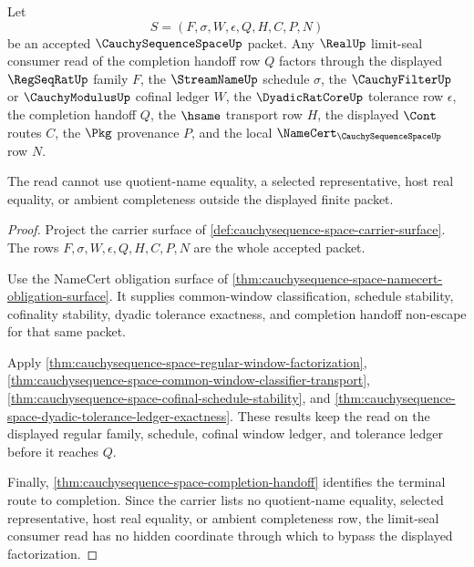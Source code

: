 \begin{theorem}
\label{thm:cauchysequence-space-limit-seal-factorization}
Let
$$
S=(F,\sigma,W,\epsilon,Q,H,C,P,N)
$$
be an accepted $\CauchySequenceSpaceUp$ packet. Any $\RealUp$ limit-seal consumer read of the completion handoff row $Q$ factors through the displayed $\RegSeqRatUp$ family $F$, the $\StreamNameUp$ schedule $\sigma$, the $\CauchyFilterUp$ or $\CauchyModulusUp$ cofinal ledger $W$, the $\DyadicRatCoreUp$ tolerance row $\epsilon$, the completion handoff $Q$, the $\hsame$ transport row $H$, the displayed $\Cont$ routes $C$, the $\Pkg$ provenance $P$, and the local $\NameCert_{\CauchySequenceSpaceUp}$ row $N$.

The read cannot use quotient-name equality, a selected representative, host real equality, or ambient completeness outside the displayed finite packet.
\end{theorem}
\begin{proof}
Project the carrier surface of \autoref{def:cauchysequence-space-carrier-surface}. The rows $F,\sigma,W,\epsilon,Q,H,C,P,N$ are the whole accepted packet.

Use the NameCert obligation surface of \autoref{thm:cauchysequence-space-namecert-obligation-surface}. It supplies common-window classification, schedule stability, cofinality stability, dyadic tolerance exactness, and completion handoff non-escape for that same packet.

Apply \autoref{thm:cauchysequence-space-regular-window-factorization}, \autoref{thm:cauchysequence-space-common-window-classifier-transport}, \autoref{thm:cauchysequence-space-cofinal-schedule-stability}, and \autoref{thm:cauchysequence-space-dyadic-tolerance-ledger-exactness}. These results keep the read on the displayed regular family, schedule, cofinal window ledger, and tolerance ledger before it reaches $Q$.

Finally, \autoref{thm:cauchysequence-space-completion-handoff} identifies the terminal route to completion. Since the carrier lists no quotient-name equality, selected representative, host real equality, or ambient completeness row, the limit-seal consumer read has no hidden coordinate through which to bypass the displayed factorization.
\end{proof}

